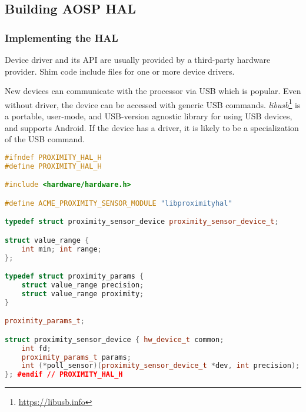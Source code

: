 \subsection{Building AOSP HAL}
\label{task:20231119_aosp_hal}

\subsubsection*{Implementing the HAL}

Device driver and its API are usually provided by a third-party hardware provider. Shim code include  files for one or more device drivers.

New devices can communicate with the processor via USB which is popular. Even without driver, the device can be accessed with generic USB commands. 
\textit{libusb}\footnote{\url{https://libusb.info}} is a portable, user-mode, and USB-version agnostic library for using USB devices, and supports Android. If the device has a driver, it is likely to be a specialization of the USB command.

\begin{lstlisting}[language=C++]
#ifndef PROXIMITY_HAL_H 
#define PROXIMITY_HAL_H 

#include <hardware/hardware.h> 

#define ACME_PROXIMITY_SENSOR_MODULE "libproximityhal" 

typedef struct proximity_sensor_device proximity_sensor_device_t; 

struct value_range { 
    int min; int range; 
}; 

typedef struct proximity_params { 
    struct value_range precision; 
    struct value_range proximity; 
} 

proximity_params_t; 

struct proximity_sensor_device { hw_device_t common; 
    int fd; 
    proximity_params_t params; 
    int (*poll_sensor)(proximity_sensor_device_t *dev, int precision); 
}; #endif // PROXIMITY_HAL_H

\end{lstlisting}